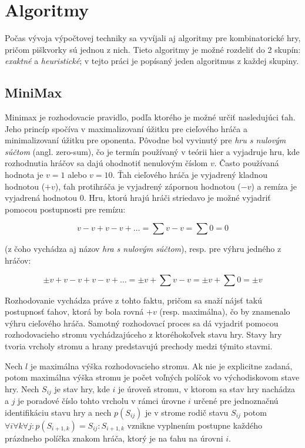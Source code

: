 \section{Algoritmy}\label{sec:algorithms}

Počas vývoja výpočtovej techniky sa vyvíjali aj algoritmy pre kombinatorické hry, pričom piškvorky sú jednou z nich.
Tieto algoritmy je možné rozdeliť do 2 skupín: \emph{exaktné} a \emph{heuristické}; v tejto práci je popísaný jeden
algoritmus z každej skupiny.

\subsection{MiniMax}\label{subsec:algo-minmax}

Minimax je rozhodovacie pravidlo, podľa ktorého je možné určiť nasledujúci ťah.
Jeho princíp spočíva v maximalizovaní úžitku pre cieľového hráča a minimalizovaní úžitku pre oponenta.
Pôvodne bol vyvinutý pre \emph{hru s nulovým súčtom} (angl. zero-sum), čo je termín používaný v teórii hier a vyjadruje
hru, kde rozhodnutia hráčov sa dajú ohodnotiť nenulovým číslom $v$.
Často používaná hodnota je $v=1$ alebo $v=10$.
Ťah cieľového hráča je vyjadrený kladnou hodnotou ($+v$), ťah protihráča je vyjadrený zápornou hodnotou ($-v$) a remíza
je vyjadrená hodnotou $0$.
Hru, ktorú hrajú hráči striedavo je možné vyjadriť pomocou postupnosti pre remízu:

\begin{equation}
    v-v+v-v+ \dots = \sum{v-v} = \sum{0} = 0
\end{equation}

(z čoho vychádza aj názov \emph{hra s nulovým súčtom}), resp. pre výhru jedného z hráčov:

\begin{equation}
    \pm v+v-v+v-v+ \dots = \pm v+\sum{v-v} = \pm v+\sum{0} = \pm v
\end{equation}

Rozhodovanie vychádza práve z tohto faktu, pričom sa snaží nájsť takú postupnosť ťahov, ktorá by bola rovná $+v$
(resp. maximálna), čo by znamenalo výhru cieľového hráča.
Samotný rozhodovací proces sa dá vyjadriť pomocou rozhodovacieho stromu vychádzajúceho z ktoréhokoľvek stavu hry.
Stavy hry tvoria vrcholy stromu a hrany predstavujú prechody medzi týmito stavmi.

Nech $l$ je maximálna výška rozhodovacieho stromu.
Ak nie je explicitne zadaná, potom maximálna výška stromu je počet voľných políčok vo východiskovom stave hry.
Nech $S_{ij}$ je stav hry, kde $i$ je úroveň stromu, v ktorom sa stav hry nachádza a $j$ je poradové číslo tohto vrcholu
v rámci úrovne $i$ určené pre jednoznačnú identifikáciu stavu hry a nech $p(S_{ij})$ je v strome rodič stavu $S_{ij}$
potom $\forall i \forall k \forall j \colon p(S_{i+1,k}) = S_{ij} \colon S_{i+1,k}$ vznikne vyplnením postupne každého
prázdneho políčka znakom hráča, ktorý je na ťahu na úrovni $i$.

